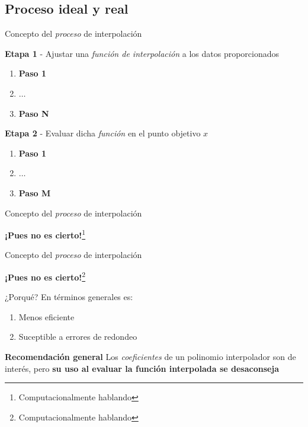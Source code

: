 \documentclass[11pt]{beamer}
\begin{document}
\subsection{Proceso ideal y real}
\begin{frame}{Concepto del \textit{proceso} de interpolación}
\begin{block}{\textbf{Etapa 1} - Ajustar una \textit{función de interpolación} a los datos proporcionados}
\begin{enumerate}
\item \textbf{Paso 1}
\item $\dots$
\item \textbf{Paso N}
\end{enumerate}
\end{block}
\begin{block}{\textbf{Etapa 2} - Evaluar dicha \textit{función} en el punto objetivo $x$}
\begin{enumerate}
\item \textbf{Paso 1}
\item $\dots$
\item \textbf{Paso M}
\end{enumerate}
\end{block}

\end{frame}

\begin{frame}{Concepto del \textit{proceso} de interpolación}
\centering
\begin{Huge}
\textbf{¡Pues no es cierto!}\footnote{Computacionalmente hablando}
\end{Huge}
\end{frame}

\begin{frame}{Concepto del \textit{proceso} de interpolación}
\centering
\begin{Huge}
\textbf{¡Pues no es cierto!}\footnote{Computacionalmente hablando}
\end{Huge}

\begin{block}{¿Porqué?}
En términos generales es:
\begin{enumerate}
\item Menos eficiente
\item Suceptible a errores de redondeo
\end{enumerate}
\end{block}
\begin{block}{\textbf{Recomendación general}}
Los \textit{coeficientes} de un polinomio interpolador son de interés, pero \textbf{su uso al evaluar la función interpolada se desaconseja}
\end{block}
\end{frame}
\end{document}
